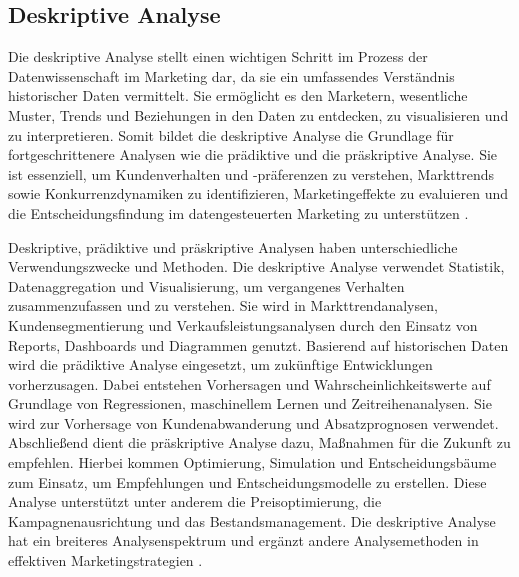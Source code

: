 \subsection{Deskriptive Analyse}
\label{deskriptiveanalyse}
Die deskriptive Analyse stellt einen wichtigen Schritt im Prozess der Datenwissenschaft im Marketing dar, da sie ein umfassendes Verständnis historischer Daten vermittelt. Sie ermöglicht es den Marketern, wesentliche Muster, Trends und Beziehungen in den Daten zu entdecken, zu visualisieren und zu interpretieren. Somit bildet die deskriptive Analyse die Grundlage für fortgeschrittenere Analysen wie die prädiktive und die präskriptive Analyse. Sie ist essenziell, um Kundenverhalten und -präferenzen zu verstehen, Markttrends sowie Konkurrenzdynamiken zu identifizieren, Marketingeffekte zu evaluieren und die Entscheidungsfindung im datengesteuerten Marketing zu unterstützen \cite{brown2024mastering}. \par
Deskriptive, prädiktive und präskriptive Analysen haben unterschiedliche Verwendungszwecke und Methoden.
Die deskriptive Analyse verwendet Statistik, Datenaggregation und Visualisierung, um vergangenes Verhalten zusammenzufassen und zu verstehen. Sie wird in Markttrendanalysen, Kundensegmentierung und Verkaufsleistungsanalysen durch den Einsatz von Reports, Dashboards und Diagrammen genutzt. Basierend auf historischen Daten wird die prädiktive Analyse eingesetzt, um zukünftige Entwicklungen vorherzusagen. Dabei entstehen Vorhersagen und Wahrscheinlichkeitswerte auf Grundlage von Regressionen, maschinellem Lernen und Zeitreihenanalysen. Sie wird zur Vorhersage von Kundenabwanderung und Absatzprognosen verwendet. Abschließend dient die präskriptive Analyse dazu, Maßnahmen für die Zukunft zu empfehlen. Hierbei kommen Optimierung, Simulation und Entscheidungsbäume zum Einsatz, um Empfehlungen und Entscheidungsmodelle zu erstellen. Diese Analyse unterstützt unter anderem die Preisoptimierung, die Kampagnenausrichtung und das Bestandsmanagement. Die deskriptive Analyse hat ein breiteres Analysenspektrum und ergänzt andere Analysemethoden in effektiven Marketingstrategien \cite[S. 51 ff]{brown2024mastering}. 


